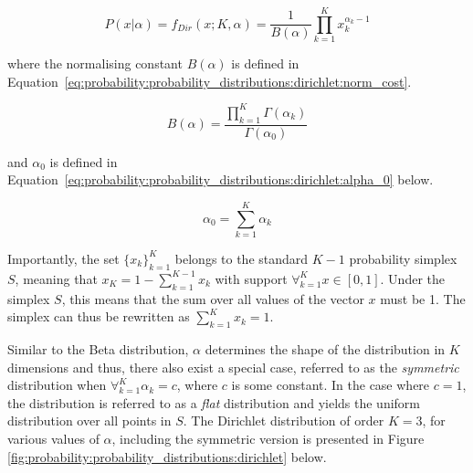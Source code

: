 \begin{equation}
      \label{eq:probability:probability_distributions:dirichlet:pdf}
      P(x \vert \alpha) =  f_{Dir}(x; K, \alpha) = \frac{1}{B(\alpha)}  \prod_{k=1}^{K} x_{k}^{\alpha_{k} - 1}
\end{equation}

where the normalising constant $B(\alpha)$ is defined in Equation~\eqref{eq:probability:probability_distributions:dirichlet:norm_cost}.

\begin{equation}
      \label{eq:probability:probability_distributions:dirichlet:norm_cost}
      B(\alpha) = \frac{\prod_{k=1}^{K} \Gamma(\alpha_{k})}{\Gamma(\alpha_{0})}
\end{equation}

and $\alpha_{0}$ is defined in Equation~\eqref{eq:probability:probability_distributions:dirichlet:alpha_0} below.

\begin{equation}
      \label{eq:probability:probability_distributions:dirichlet:alpha_0}
      \alpha_{0} = \sum_{k=1}^{K}\alpha_{k}
\end{equation}

Importantly, the set $\{x_{k}\}_{k=1}^{K}$ belongs to the standard $K-1$ probability simplex $S$, meaning that $x_{K} = 1 - \sum_{k=1}^{K-1}x_{k}$ with support $\forall_{k=1}^{K} x \in [0,1]$. Under the simplex $S$, this means that the sum over all values of the vector $x$ must be 1. The simplex can thus be rewritten as $\sum_{k=1}^{K}x_{k} = 1$.

Similar to the Beta distribution, $\alpha$ determines the shape of the distribution in $K$ dimensions and thus, there also exist a special case, referred to as the \textit{symmetric} distribution when $\forall_{k=1}^{K} \alpha_{k} = c$, where $c$ is some constant. In the case where $c = 1$, the distribution is referred to as a \textit{flat} distribution and yields the uniform distribution over all points in $S$. The Dirichlet distribution of order $K = 3$, for various values of $\alpha$, including the symmetric version is presented in Figure \ref{fig:probability:probability_distributions:dirichlet} below.

